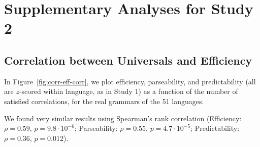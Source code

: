\documentclass[10pt,twoside,lineno]{article}
\begin{document}
\section{Supplementary Analyses for Study 2}
\subsection{Correlation between Universals and Efficiency}

In Figure~\ref{fig:corr-eff-corr}, we plot efficiency, parseability, and predictability (all are $z$-scored within language, as in Study 1) as a function of the number of satisfied correlations, for the real grammars of the 51 languages.

We found very similar results using Spearman's rank correlation (Efficiency: $\rho=0.59$, $p = 9.8 \cdot 10^{-6}$; Parseability: $\rho=0.55$, $p=4.7 \cdot 10^{-5}$; Predictability: $\rho=0.36$, $p=0.012$).
\end{document}
